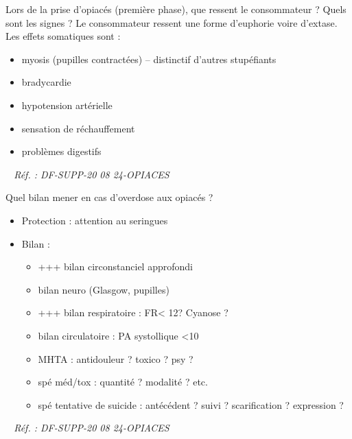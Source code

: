 \documentclass[grid,avery5371,landscape]{flashcards}
\makeatletter
\newcounter{nocarte}
\newcommand{\categ}[1]{%
  \def\@categ{#1}%
  \setcounter{nocarte}{0}%
}
\newcommand{\source}[1]{%
  \medskip
  \itshape%
   ~ \hfill Réf. : #1}
\makeatother
\begin{document}
\color[HTML]{FF6D01}
\categ{PSE+}
\begin{flashcard}[bilan]{
 Lors de la prise d'opiacés (première phase), que ressent le consommateur ? Quels sont les signes ?   }
      Le consommateur ressent une forme d'euphorie voire d'extase. \\     Les effets somatiques sont :    \begin{itemize}         \item myosis (pupilles contractées)  -- distinctif d'autres stupéfiants       \item bradycardie          \item hypotension artérielle         \item sensation de réchauffement         \item problèmes digestifs    \end{itemize}
  \source{DF-SUPP-20 08 24-OPIACES}
\end{flashcard}


\color[HTML]{FF6D01}
\categ{PSE+}
\begin{flashcard}[bilan]{
 Quel bilan mener en cas d'overdose aux opiacés ?   }
  \begin{itemize}
       \item Protection : attention au seringues
       \item Bilan :
        \begin{itemize}
            \item +++ bilan circonstanciel approfondi
            \item bilan neuro (Glasgow, pupilles)
            \item +++ bilan respiratoire : FR< 12? Cyanose ?
            \item bilan circulatoire : PA systollique <10
            \item MHTA : antidouleur ? toxico ? psy ?
            \item spé méd/tox : quantité ? modalité ? etc.
            \item spé tentative de suicide : antécédent ? suivi ? scarification ? expression ?
        \end{itemize}
   \end{itemize}
  \source{DF-SUPP-20 08 24-OPIACES}
\end{flashcard}
\end{document}
